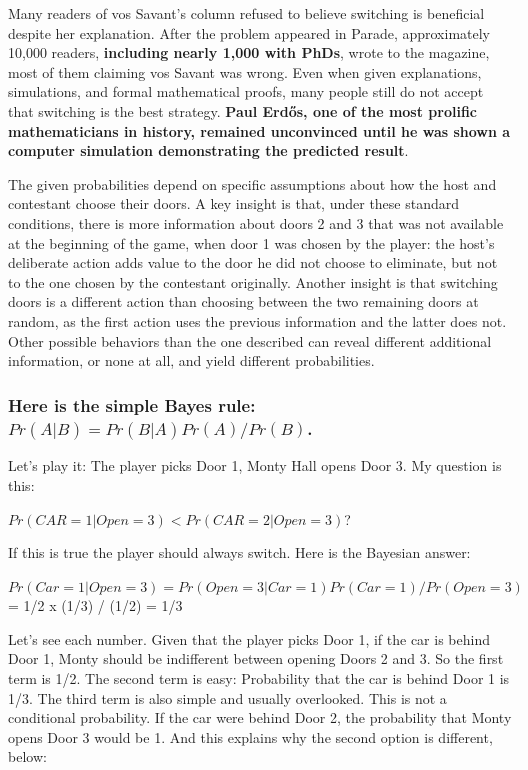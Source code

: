 \documentclass[
]{book}
\begin{document}
Many readers of vos Savant's column refused to believe switching is beneficial despite her explanation. After the problem appeared in Parade, approximately 10,000 readers, \textbf{including nearly 1,000 with PhDs}, wrote to the magazine, most of them claiming vos Savant was wrong. Even when given explanations, simulations, and formal mathematical proofs, many people still do not accept that switching is the best strategy. \textbf{Paul Erdős, one of the most prolific mathematicians in history, remained unconvinced until he was shown a computer simulation demonstrating the predicted result}.

The given probabilities depend on specific assumptions about how the host and contestant choose their doors. A key insight is that, under these standard conditions, there is more information about doors 2 and 3 that was not available at the beginning of the game, when door 1 was chosen by the player: the host's deliberate action adds value to the door he did not choose to eliminate, but not to the one chosen by the contestant originally. Another insight is that switching doors is a different action than choosing between the two remaining doors at random, as the first action uses the previous information and the latter does not. Other possible behaviors than the one described can reveal different additional information, or none at all, and yield different probabilities.

\hypertarget{here-is-the-simple-bayes-rule-prab-prbapraprb.}{%
\subsubsection*{\texorpdfstring{Here is the simple Bayes rule: \(Pr(A|B) = Pr(B|A)Pr(A)/Pr(B)\).}{Here is the simple Bayes rule: Pr(A\textbar B) = Pr(B\textbar A)Pr(A)/Pr(B).}}\label{here-is-the-simple-bayes-rule-prab-prbapraprb.}}

Let's play it: The player picks Door 1, Monty Hall opens Door 3. My question is this:

\(Pr(CAR = 1|Open = 3) < Pr(CAR = 2|Open = 3)\)?

If this is true the player should always switch. Here is the Bayesian answer:

\(Pr(Car=1|Open=3) = Pr(Open=3|Car=1)Pr(Car=1)/Pr(Open=3)\) = 1/2 x (1/3) / (1/2) = 1/3

Let's see each number. Given that the player picks Door 1, if the car is behind Door 1, Monty should be indifferent between opening Doors 2 and 3. So the first term is 1/2. The second term is easy: Probability that the car is behind Door 1 is 1/3. The third term is also simple and usually overlooked. This is not a conditional probability. If the car were behind Door 2, the probability that Monty opens Door 3 would be 1. And this explains why the second option is different, below:
\end{document}
